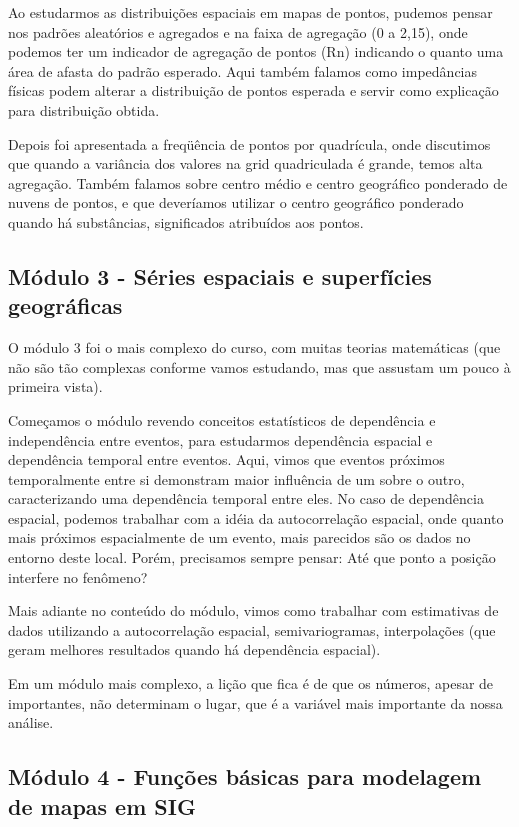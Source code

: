 Ao estudarmos as distribuições espaciais em mapas de pontos, pudemos pensar nos padrões aleatórios e agregados e na faixa de agregação (0 a 2,15), onde podemos ter um indicador de agregação de pontos (Rn)  indicando o quanto uma área de afasta do padrão esperado. Aqui também falamos como impedâncias físicas podem alterar a distribuição de pontos esperada e servir como explicação para distribuição obtida.

Depois foi apresentada a freqüência de pontos por quadrícula, onde discutimos que quando a variância dos valores na grid quadriculada é grande, temos alta agregação. Também falamos sobre centro médio e centro geográfico ponderado de nuvens de pontos, e que deveríamos utilizar o centro geográfico ponderado quando há substâncias, significados atribuídos aos pontos.

\subsection{Módulo 3 - Séries espaciais e superfícies geográficas}

O módulo 3 foi o mais complexo do curso, com muitas teorias matemáticas (que não são tão complexas conforme vamos estudando, mas que assustam um pouco à primeira vista). 

Começamos o módulo revendo conceitos estatísticos de dependência e independência entre eventos, para estudarmos dependência espacial e dependência temporal entre eventos. Aqui, vimos que eventos próximos temporalmente entre si demonstram maior influência de um sobre o outro, caracterizando uma dependência temporal entre eles. No caso de dependência espacial, podemos trabalhar com a idéia da autocorrelação espacial, onde quanto mais próximos espacialmente de um evento, mais parecidos são os dados no entorno deste local. Porém, precisamos sempre pensar: Até que ponto a posição interfere no fenômeno?

Mais adiante no conteúdo do módulo, vimos como trabalhar com estimativas de dados utilizando a autocorrelação espacial, semivariogramas, interpolações (que geram melhores resultados quando há dependência espacial).

Em um módulo mais complexo, a lição que fica é de que os números, apesar de importantes, não determinam o lugar, que é a variável mais importante da nossa análise.

\subsection{Módulo 4 - Funções básicas para modelagem de mapas em SIG}

